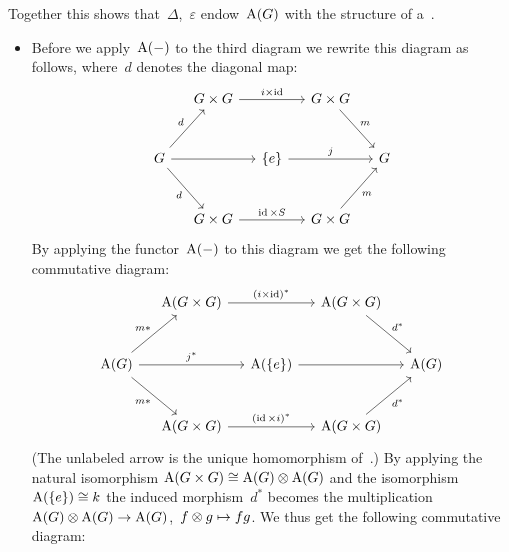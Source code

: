 \begin{fluff}
  Together this shows that~$\Delta$,~$\varepsilon$ endow~$\operatorname{A}(G)$ with the structure of a~.
  \begin{itemize}[resume]
    \item
      Before we apply~$\operatorname{A}(-)$ to the third diagram we rewrite this diagram as follows, where~$d$ denotes the diagonal map:
      \[
        \begin{tikzcd}[column sep = small, row sep = large]
            {}
          & G \times G
            \arrow{rr}[above]{i \times \id}
          & {}
          & G \times G
            \arrow{dr}[above right]{m}
          & {}
          \\
            G
            \arrow{ur}[above left]{d}
            \arrow{rr}[above]{}
            \arrow{dr}[below left]{d}
          & {}
          & \{e\}
            \arrow{rr}[above]{j}
          & {}
          & G
          \\
            {}
          & G \times G
            \arrow{rr}[above]{\id \times S}
          & {}
          & G \times G
            \arrow{ur}[below right]{m}
          & {}
        \end{tikzcd}
      \]
      By applying the functor~$\operatorname{A}(-)$ to this diagram we get the following commutative diagram:
      \[
        \begin{tikzcd}[column sep = small, row sep = large]
            {}
          & \coord(G \times G)
            \arrow{rr}[above]{(i \times \id)^*}
          & {}
          & \coord(G \times G)
            \arrow{dr}[above right]{d^*}
          & {}
          \\
            \coord(G)
            \arrow{ur}[above left]{m*}
            \arrow{rr}[above]{j^*}
            \arrow{dr}[below left]{m*}
          & {}
          & \coord(\{e\})
            \arrow{rr}
          & {}
          & \coord(G)
          \\
            {}
          & \coord(G \times G)
            \arrow{rr}[above]{(\id \times i)^*}
          & {}
          & \coord(G \times G)
            \arrow{ur}[below right]{d^*}
          & {}
        \end{tikzcd}
      \]
      (The unlabeled arrow is the unique homomorphism of~.)
      By applying the natural isomorphism $\operatorname{A}(G \times G) \cong \operatorname{A}(G) \mathbin{\otimes} \operatorname{A}(G)$ and the isomorphism~$\operatorname{A}(\{e\}) \cong k$ the induced morphism~$d^*$ becomes the multiplication~$\operatorname{A}(G) \mathbin{\otimes} \operatorname{A}(G) \to \operatorname{A}(G)$,~$f \mathbin{\otimes} g \mapsto fg$.
      We thus get the following commutative diagram:

\end{itemize}
\end{fluff}
